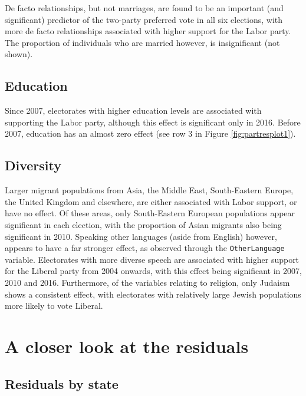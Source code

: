 \documentclass[11pt,a4paper,]{article}
\begin{document}
De facto relationships, but not marriages, are found to be an important (and significant) predictor of the two-party preferred vote in all six elections, with more de facto relationships associated with higher support for the Labor party. The proportion of individuals who are married however, is insignificant (not shown).

\hypertarget{education}{%
\subsection*{Education}\label{education}}

Since 2007, electorates with higher education levels are associated with supporting the Labor party, although this effect is significant only in 2016. Before 2007, education has an almost zero effect (see row 3 in Figure \ref{fig:partresplot1}).

\hypertarget{diversity}{%
\subsection*{Diversity}\label{diversity}}

Larger migrant populations from Asia, the Middle East, South-Eastern Europe, the United Kingdom and elsewhere, are either associated with Labor support, or have no effect. Of these areas, only South-Eastern European populations appear significant in each election, with the proportion of Asian migrants also being significant in 2010. Speaking other languages (aside from English) however, appears to have a far stronger effect, as observed through the \texttt{OtherLanguage} variable. Electorates with more diverse speech are associated with higher support for the Liberal party from 2004 onwards, with this effect being significant in 2007, 2010 and 2016. Furthermore, of the variables relating to religion, only Judaism shows a consistent effect, with electorates with relatively large Jewish populations more likely to vote Liberal.

\hypertarget{a-closer-look-at-the-residuals}{%
\section{A closer look at the residuals}\label{a-closer-look-at-the-residuals}}

\hypertarget{residuals-by-state}{%
\subsection{Residuals by state}\label{residuals-by-state}}
\end{document}
